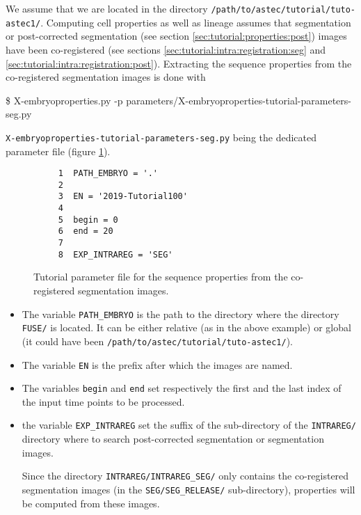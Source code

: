 We assume that we are located in the directory
\texttt{/path/to/astec/tutorial/tuto-astec1/}.
Computing cell properties as well as lineage assumes that
 segmentation or post-corrected segmentation (see section
\ref{sec:tutorial:properties:post}) images have been
co-registered (see sections \ref{sec:tutorial:intra:registration:seg}
and \ref{sec:tutorial:intra:registration:post}). 
Extracting the sequence properties from the co-registered segmentation
images is
done with
\begin{code}{0.8}
  \$ X-embryoproperties.py -p parameters/X-embryoproperties-tutorial-parameters-seg.py
\end{code}
\texttt{X-embryoproperties-tutorial-parameters-seg.py} being the
dedicated parameter file  (figure \ref{fig:tutorial:parameter:properties:seg}).

\begin{figure}
\begin{framed}
\begin{verbatim}
     1	PATH_EMBRYO = '.'
     2	
     3	EN = '2019-Tutorial100'
     4	
     5	begin = 0
     6	end = 20
     7	
     8	EXP_INTRAREG = 'SEG'
\end{verbatim}
\end{framed}
\caption{\label{fig:tutorial:parameter:properties:seg} Tutorial
  parameter file for the sequence properties from the co-registered
  segmentation images.}
\end{figure}

\begin{itemize}
  \itemsep -0.5ex
  \item The variable \texttt{PATH\_EMBRYO} is the path to the directory where
    the directory \texttt{FUSE/} is located. It can be either relative (as in the
    above example) or
    global (it could have been \texttt{/path/to/astec/tutorial/tuto-astec1/}).
  \item The variable \texttt{EN} is the prefix after which the  images
    are named. 
  \item The variables \texttt{begin} and \texttt{end} set respectively the
    first and the last index of the input time points to be processed.
  \item  the variable \texttt{EXP\_INTRAREG} set the suffix of the
    sub-directory of the \texttt{INTRAREG/} directory where to search
    post-corrected segmentation or segmentation images.

    Since the directory \texttt{INTRAREG/INTRAREG\_SEG/}  only
    contains the co-registered segmentation images (in the
    \texttt{SEG/SEG\_RELEASE/} sub-directory), properties will be computed from
    these images.
\end{itemize}

